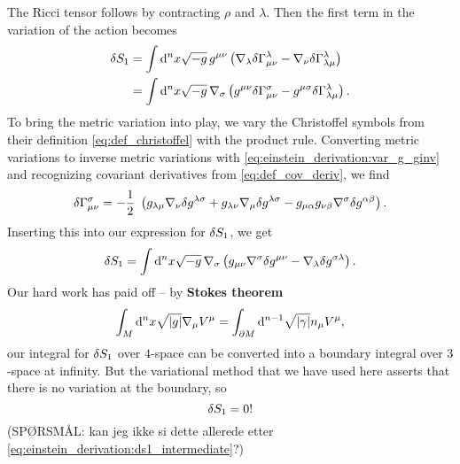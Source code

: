 The Ricci tensor follows by contracting $\rho$ and $\lambda$. 
Then the first term in the variation of the action becomes
\begin{equation}
\begin{split}
	\delta S_1 &= \int \mathop{}\!\mathrm{d}^n x \sqrt{-g} \, g^{\mu \nu} \left( \nabla_\lambda \delta \Gamma^\lambda_{\mu \nu} - \nabla_\nu \delta \Gamma^\lambda_{\lambda \mu} \right) \\
	                &= \int \mathop{}\!\mathrm{d}^n x \sqrt{-g} \, \nabla_\sigma \left( g^{\mu \nu} \delta \Gamma^\sigma_{\mu \nu} - g^{\mu \sigma} \delta \Gamma^\lambda_{\lambda \mu} \right) . \\
	\label{eq:einstein_derivation:ds1_intermediate}
\end{split}
\end{equation}
To bring the metric variation into play, we vary the Christoffel symbols from their definition \eqref{eq:def_christoffel} with the product rule.
Converting metric variations to inverse metric variations with \eqref{eq:einstein_derivation:var_g_ginv} and recognizing covariant derivatives from \cref{eq:def_cov_deriv}, we find
\begin{equation}
	\variation{\Gamma^\sigma_{\mu \nu}} = -\frac{1}{2} \left( 
		g_{\lambda \mu} \nabla_\nu \variation{g^{\lambda \sigma}} +
		g_{\lambda \nu} \nabla_\mu \variation{g^{\lambda \sigma}} -
		g_{\mu \alpha} g_{\nu \beta} \nabla^\sigma \variation{g^{\alpha \beta}}
	\right) .
\end{equation}
Inserting this into our expression for $\delta S_1$, we get
\begin{equation}
	\delta S_1 = \int \mathop{}\!\mathrm{d}^n x \sqrt{-g} \, \nabla_\sigma \left( g_{\mu \nu} \nabla^\sigma \delta g^{\mu \nu} - \nabla_\lambda \delta g^{\sigma \lambda} \right).
\end{equation}
Our hard work has paid off -- by \textbf{Stokes theorem} \cite[equation 3.35]{ref:carroll}
\begin{equation}
	\int_M \mathop{}\!\mathrm{d}^n x \sqrt{\lvert g \rvert} \nabla_\mu V^\mu = \int_{\partial M} \mathop{}\!\mathrm{d}^{n-1} \sqrt{\lvert \gamma \rvert} n_\mu V^\mu ,
\end{equation}
our integral for $\delta S_1$ over $4$-space can be converted into a boundary integral over $3$-space at infinity.
But the variational method that we have used here asserts that there is no variation at the boundary, so
\begin{equation}
	\delta S_1 = 0 !
\end{equation}
(SPØRSMÅL: kan jeg ikke si dette allerede etter \eqref{eq:einstein_derivation:ds1_intermediate}?)

